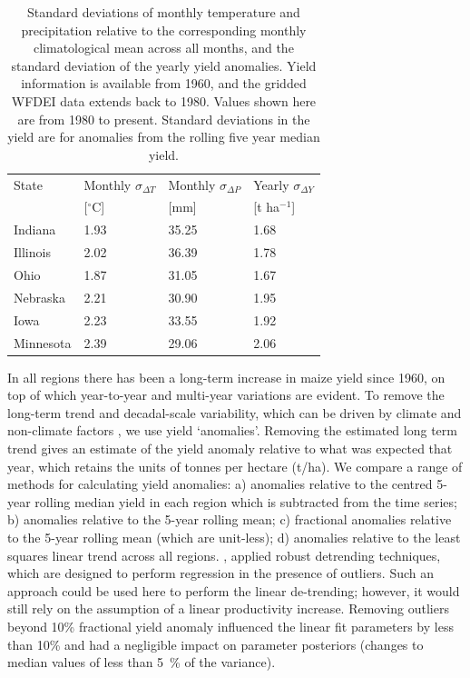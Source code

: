 \documentclass[12pt]{article}
\begin{document}
\begin{table}
\centering
\caption{
Standard deviations of monthly temperature and precipitation relative to the corresponding monthly climatological mean across all months, and the standard deviation of the yearly yield anomalies. Yield information is available from 1960, and the gridded WFDEI data extends back to 1980. Values shown here are from 1980 to present. Standard deviations in the yield are for anomalies from the rolling five year median yield.}


\label{table:data}
\vskip 0.15in
\begin{tabular}{llll}
State  & 
Monthly $\sigma_{\Delta T}$   & 
Monthly $\sigma_{\Delta P}$   & 
Yearly $\sigma_{\Delta Y}$   \\

& [$^\circ$C] & [mm] & [t ha$^{-1}$]\\
\hline
Indiana & 1.93 & 35.25 & 1.68 \\ 
Illinois & 2.02 & 36.39 & 1.78 \\ 
Ohio & 1.87 & 31.05 & 1.67 \\ 
Nebraska & 2.21 & 30.90 & 1.95 \\ 
Iowa & 2.23 & 33.55 & 1.92 \\ 
Minnesota & 2.39 & 29.06 & 2.06 \\ 
\end{tabular}
\end{table}

In all regions there has been a long-term increase in maize yield since 1960, on top of which year-to-year and multi-year variations are evident. To remove the long-term trend and decadal-scale variability, which can be driven by climate and non-climate factors \citep[e.g.][]{hawkins:2013, ray:2015}, we use yield `anomalies'. Removing the estimated long term trend gives an estimate of the yield anomaly relative to what was expected that year, which retains the units of tonnes per hectare (t/ha). We compare a range of methods for calculating yield anomalies: a) anomalies relative to the centred 5-year rolling median yield in each region which is subtracted from the time series; b) anomalies relative to the 5-year rolling mean; c) fractional anomalies relative to the 5-year rolling mean (which are unit-less); d) anomalies relative to the least squares linear trend across all regions. \citet{finger:2010}, applied robust detrending techniques, which are designed to perform regression in the presence of outliers. Such an approach could be used here to perform the linear de-trending; however, it would still rely on the assumption of a linear productivity increase. Removing outliers beyond 10\% fractional yield anomaly influenced the linear fit parameters by less than 10\% and had a negligible impact on parameter posteriors (changes to median values of less than 5~\% of the variance).
\end{document}
